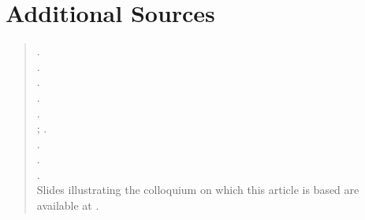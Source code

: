 \documentclass[twoside,symmetric]{tufte-handout}
\begin{document}
\section{Additional Sources\label{sources}}
\begin{quotation}
.\label{auguste}\\[6pt]

\noindent{}.\\[6pt]

\noindent{}.\\[6pt]

\noindent{}.\\[6pt]

\noindent {}.
\\[6pt]%

\noindent{}; .\\[6pt]
\noindent{}.\\[6pt]
\noindent{}.\\[6pt]
\noindent{}.\\[6pt]
\noindent Slides illustrating the colloquium on which this article is based are available at .
\end{quotation}

\end{document}
